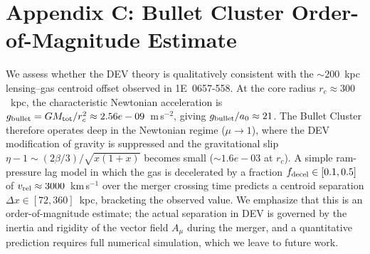 \section*{Appendix C: Bullet Cluster Order-of-Magnitude Estimate}

We assess whether the DEV theory is qualitatively consistent with the
$\sim 200$~kpc lensing--gas centroid offset observed in 1E~0657-558.
At the core radius $r_c \approx 300$~kpc, the characteristic Newtonian
acceleration is $g_{\rm bullet} = G M_{\rm tot}/r_c^2 \approx 2.56e-09$~m\,s$^{-2}$,
giving $g_{\rm bullet}/a_0 \approx 21$. The Bullet Cluster therefore
operates deep in the Newtonian regime ($\mu \to 1$), where the DEV
modification of gravity is suppressed and the gravitational slip
$\eta - 1 \sim (2\beta/3)/\sqrt{x(1+x)}$ becomes small ($\sim 1.6e-03$ at $r_c$).
A simple ram-pressure lag model in which the gas is decelerated by
a fraction $f_{\rm decel} \in [0.1, 0.5]$ of $v_{\rm rel} \approx 3000$~km\,s$^{-1}$
over the merger crossing time predicts a centroid separation
$\Delta x \in [72, 360]$~kpc, bracketing the observed value.
We emphasize that this is an order-of-magnitude estimate; the actual
separation in DEV is governed by the inertia and rigidity of the vector
field $A_\mu$ during the merger, and a quantitative prediction requires
full numerical simulation, which we leave to future work.
